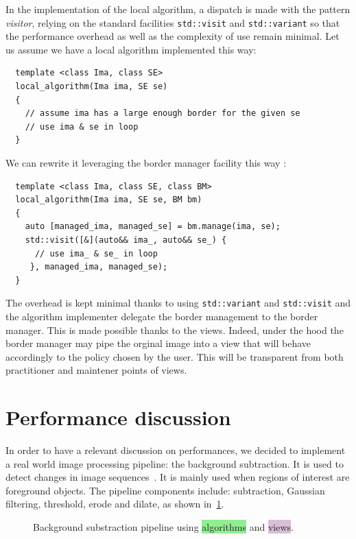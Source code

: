 In the implementation of the local algorithm, a dispatch is made with the pattern \emph{visitor}, relying on the
standard facilities \texttt{std::visit} and \texttt{std::variant} so that the performance overhead as well as the
complexity of use remain minimal. Let us assume we have a local algorithm implemented this way:
\begin{verbatim}
  template <class Ima, class SE>
  local_algorithm(Ima ima, SE se)
  {
    // assume ima has a large enough border for the given se
    // use ima & se in loop
  }
\end{verbatim}
We can rewrite it leveraging the border manager facility this way :
\begin{verbatim}
  template <class Ima, class SE, class BM>
  local_algorithm(Ima ima, SE se, BM bm)
  {
    auto [managed_ima, managed_se] = bm.manage(ima, se);
    std::visit([&](auto&& ima_, auto&& se_) { 
      // use ima_ & se_ in loop
     }, managed_ima, managed_se);
  }
\end{verbatim}
The overhead is kept minimal thanks to using \texttt{std::variant} and \texttt{std::visit} and the algorithm implementer
delegate the border management to the border manager. This is made possible thanks to the views. Indeed, under the hood
the border manager may pipe the orginal image into a view that will behave accordingly to the policy chosen by the user.
This will be transparent from both practitioner and maintener points of views.


\section{Performance discussion}

In order to have a relevant discussion on performances, we decided to implement a real world image processing pipeline:
the background subtraction. It is used to detect changes in image sequences~\cite{opencv.bg_sub}. It is mainly used when
regions of interest are foreground objects. The pipeline components include: subtraction, Gaussian filtering, threshold,
erode and dilate, as shown in~\ref{fig.view.comp.sub_bg}.

\begin{figure}[tbh]
  \begin{minipage}{\linewidth}
    
  \end{minipage}
  \caption{Background substraction pipeline using \colorbox{lightgreen}{algorithms} and
    \colorbox{thistle}{views}.}
  \label{fig.view.comp.sub_bg}
\end{figure}

